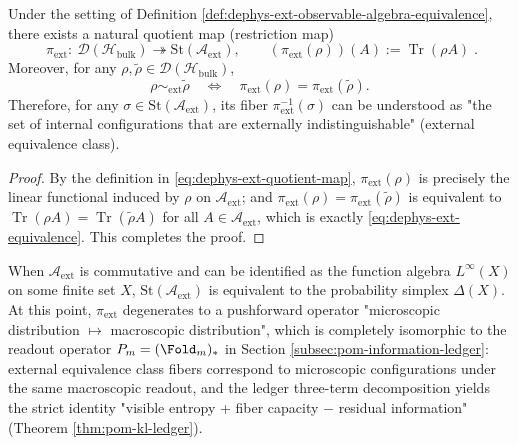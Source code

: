 \begin{proposition}\label{prop:dephys-horizon-quotient-data-structure}
Under the setting of Definition \ref{def:dephys-ext-observable-algebra-equivalence}, there exists a natural quotient map (restriction map)
\begin{equation}\label{eq:dephys-ext-quotient-map}
\boxed{\;
\pi_{\mathrm{ext}}:\ \mathcal{D}(\mathcal{H}_{\mathrm{bulk}})\twoheadrightarrow \mathrm{St}(\mathcal{A}_{\mathrm{ext}}),
\qquad
(\pi_{\mathrm{ext}}(\rho))(A):=\operatorname{Tr}(\rho A)\; }.
\end{equation}
Moreover, for any \(\rho,\tilde\rho\in\mathcal{D}(\mathcal{H}_{\mathrm{bulk}})\),
\[
\boxed{\;
\rho\sim_{\mathrm{ext}}\tilde\rho
\quad\Longleftrightarrow\quad
\pi_{\mathrm{ext}}(\rho)=\pi_{\mathrm{ext}}(\tilde\rho).\;}
\]
Therefore, for any \(\sigma\in \mathrm{St}(\mathcal{A}_{\mathrm{ext}})\), its fiber
\(
\pi_{\mathrm{ext}}^{-1}(\sigma)
\)
can be understood as "the set of internal configurations that are externally indistinguishable" (external equivalence class).
\end{proposition}

\begin{proof}
By the definition in \eqref{eq:dephys-ext-quotient-map}, \(\pi_{\mathrm{ext}}(\rho)\) is precisely the linear functional induced by \(\rho\) on \(\mathcal{A}_{\mathrm{ext}}\);
and \(\pi_{\mathrm{ext}}(\rho)=\pi_{\mathrm{ext}}(\tilde\rho)\) is equivalent to
\(\operatorname{Tr}(\rho A)=\operatorname{Tr}(\tilde\rho A)\) for all \(A\in\mathcal{A}_{\mathrm{ext}}\), which is exactly \eqref{eq:dephys-ext-equivalence}.
This completes the proof.
\end{proof}

\begin{remark}\label{rem:dephys-ext-quotient-as-pushforward}
When \(\mathcal{A}_{\mathrm{ext}}\) is commutative and can be identified as the function algebra \(L^\infty(X)\) on some finite set \(X\),
\(\mathrm{St}(\mathcal{A}_{\mathrm{ext}})\) is equivalent to the probability simplex \(\Delta(X)\).
At this point, \(\pi_{\mathrm{ext}}\) degenerates to a pushforward operator "microscopic distribution \(\mapsto\) macroscopic distribution",
which is completely isomorphic to the readout operator \(P_m=(\Fold_m)_*\) in Section \ref{subsec:pom-information-ledger}:
external equivalence class fibers correspond to microscopic configurations under the same macroscopic readout, and the ledger three-term decomposition yields the strict identity "visible entropy + fiber capacity \(-\) residual information" (Theorem \ref{thm:pom-kl-ledger}).
\end{remark}

